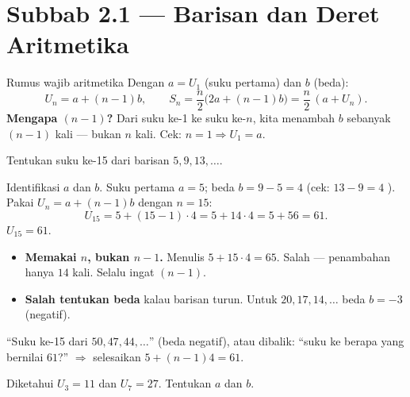 \section*{Subbab 2.1 — Barisan dan Deret Aritmetika}

\begin{ingat}{Rumus wajib aritmetika}
Dengan $a=U_1$ (suku pertama) dan $b$ (beda):
\[
U_n = a + (n-1)b, \qquad
S_n = \frac n2\big(2a+(n-1)b\big) = \frac n2\,(a+U_n).
\]
\textbf{Mengapa $(n-1)$?} Dari suku ke-1 ke suku ke-$n$, kita menambah $b$
sebanyak $(n-1)$ kali --- bukan $n$ kali. Cek: $n=1\Rightarrow U_1=a$. \checkmark
\end{ingat}

\begin{soalbox}{}
Tentukan suku ke-15 dari barisan $5, 9, 13, \dots$.
\end{soalbox}

\jawab
{} Identifikasi $a$ dan $b$. Suku pertama $a=5$; beda $b=9-5=4$
(cek: $13-9=4$ \checkmark).
 Pakai $U_n=a+(n-1)b$ dengan $n=15$:
\[
U_{15} = 5 + (15-1)\cdot 4 = 5 + 14\cdot 4 = 5 + 56 = 61.
\]
\jadi $U_{15}=61$.

\begin{jebakan}
\begin{itemize}[leftmargin=*,topsep=2pt]
  \item \textbf{Memakai $n$, bukan $n-1$.} Menulis $5+15\cdot4=65$. Salah ---
  penambahan hanya $14$ kali. Selalu ingat $(n-1)$.
  \item \textbf{Salah tentukan beda} kalau barisan turun. Untuk $20,17,14,\dots$
  beda $b=-3$ (negatif).
\end{itemize}
\end{jebakan}

\begin{variasi}
``Suku ke-15 dari $50,47,44,\dots$'' (beda negatif), atau dibalik: ``suku ke
berapa yang bernilai $61$?'' $\Rightarrow$ selesaikan $5+(n-1)4=61$.
\end{variasi}

\begin{soalbox}{}
Diketahui $U_3=11$ dan $U_7=27$. Tentukan $a$ dan $b$.
\end{soalbox}

